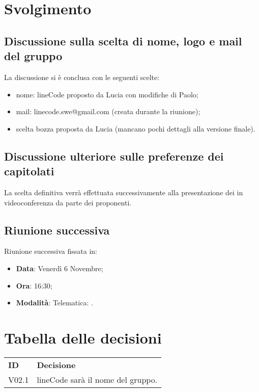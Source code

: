 \documentclass[]{article}
\begin{document}
	\newpage

	\section{Svolgimento}
		\subsection{Discussione sulla scelta di nome, logo e mail del gruppo}
		La discussione si è conclusa con le seguenti scelte:
		\begin{itemize}
				\item nome: lineCode proposto da Lucia con modifiche di Paolo;
				\item mail: linecode.swe@gmail.com (creata durante la riunione);
				\item scelta bozza proposta da Lucia (mancano pochi dettagli
	      	      alla versione finale).\\
			\end{itemize}
	      	      
		\subsection{Discussione ulteriore sulle preferenze dei capitolati}
		La scelta definitiva verrà effettuata successivamente alla
	    presentazione dei  in videoconferenza da parte dei proponenti.\\

		\subsection{Riunione successiva}
		Riunione successiva fissata in:
		\begin{itemize}
			\item \textbf{Data}: Venerdì 6 Novembre;
			\item \textbf{Ora}: 16:30;
			\item \textbf{Modalità}: Telematica: .
		\end{itemize}
	
	\newpage
	
	\section{Tabella delle decisioni}
	
	\begin{table} [h!]
		\begin{center}
			\begin{tabular} { m{2cm} m{14cm} }
				\rowcolor{lightgray}
				\textbf{ID} & \textbf{Decisione}\\
				V02.1 & lineCode sarà il nome del gruppo.\\
			\end{tabular}
		\end{center}
	\end{table}
\end{document}
